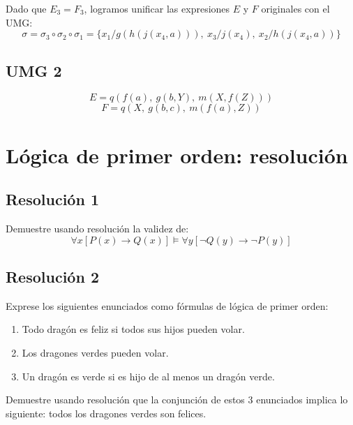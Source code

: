 \documentclass{article}
\begin{document}
Dado que $E_{3} = F_{3}$, logramos unificar las expresiones $E$ y $F$ originales
con el UMG:
$$\sigma = \sigma_{3} \circ \sigma_{2} \circ \sigma_{1} = \{x_{1} / g(h(j(x_{4}, a))),\ x_{3}/j(x_{4}),\ x_{2}/h(j(x_{4}, a))\}$$


\subsection{UMG 2}
$$E = q(f(a),\ g(b, Y),\ m(X, f(Z)))$$
$$F = q(X,\ g(b, c),\ m(f(a), Z))$$


\section{Lógica de primer orden: resolución}

\subsection{Resolución 1}
Demuestre usando resolución la validez de:
$$\forall x [P(x) \rightarrow Q(x)] \vDash \forall y [\neg Q(y) \rightarrow \neg P(y)]$$

\subsection{Resolución 2}
Exprese los siguientes enunciados como fórmulas de lógica de primer orden:
\begin{enumerate}
  \item Todo dragón es feliz si todos sus hijos pueden volar.
  \item Los dragones verdes pueden volar.
  \item Un dragón es verde si es hijo de al menos un dragón verde.
\end{enumerate}

Demuestre usando resolución que la conjunción de estos 3 enunciados implica lo
siguiente: todos los dragones verdes son felices.
\end{document}

